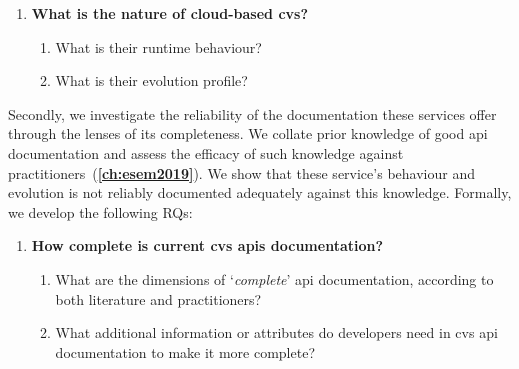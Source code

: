 \begin{leftbar}
\begin{enumerate}[label=\faQuestionCircle~~\textbf{RQ\arabic*.}, ref=RQ\arabic*, leftmargin=2.75\parindent, rightmargin=1\parindent]
    \item \textbf{What is the nature of cloud-based \gls{cvs}?}\label{rq:icsme}
    \begin{enumerate}[label=\textit{RQ1.\arabic*.}, ref=RQ1.\arabic*]
      \item What is their runtime behaviour?\label{rq:icsme:rq1}%
      \item What is their evolution profile?\label{rq:icsme:rq2}%
    \end{enumerate}
\end{enumerate}
\end{leftbar}

Secondly, we investigate the reliability of the documentation these services offer through the lenses of its completeness. We collate prior knowledge of good \gls{api} documentation and assess the efficacy of such knowledge against practitioners~(\textbf{\cref{ch:esem2019}}). We show that these service's behaviour and evolution is not reliably documented adequately against this knowledge. Formally, we develop the following RQs:

\begin{leftbar}
\begin{enumerate}[label=\faQuestionCircle~~\textbf{RQ\arabic*.}, ref=RQ\arabic*, leftmargin=2.75\parindent, rightmargin=1\parindent,start=2]
    \item \textbf{How complete is current \gls{cvs} \glspl{api} documentation?}\label{rq:esem}%
    \begin{enumerate}[label=\textit{RQ2.\arabic*.}, ref=RQ2.\arabic*]
      \item What are the dimensions of `\textit{complete}' \gls{api} documentation, according to both literature and practitioners?\label{rq:esem:rq1}%
      \item What additional information or attributes do developers need in \gls{cvs} \gls{api} documentation to make it more complete?\label{rq:esem:rq2}%
    \end{enumerate}
\end{enumerate}
\end{leftbar}

